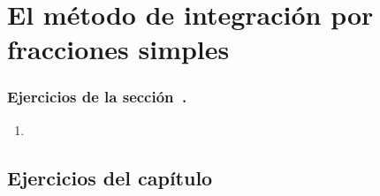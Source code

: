 \section{El método de integración por fracciones simples}


\subsubsection*{Ejercicios de la sección~.}

\begin{enumerate}
\item 
\end{enumerate}



\subsection*{Ejercicios del capítulo~}




